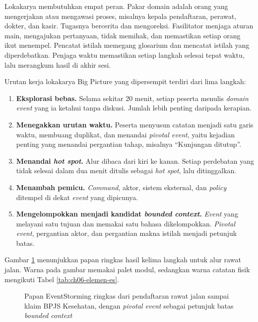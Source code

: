 Lokakarya membutuhkan empat peran. Pakar domain adalah orang yang mengerjakan atau mengawasi proses,
misalnya kepala pendaftaran, perawat, dokter, dan kasir. Tugasnya bercerita dan mengoreksi.
Fasilitator menjaga aturan main, mengajukan pertanyaan, tidak memihak, dan memastikan setiap orang
ikut menempel. Pencatat istilah memegang glosarium dan mencatat istilah yang diperdebatkan.
Penjaga waktu memastikan setiap langkah selesai tepat waktu, lalu merangkum hasil di akhir sesi.

Urutan kerja lokakarya Big Picture yang dipersempit terdiri dari lima langkah:
\begin{enumerate}
  \item \textbf{Eksplorasi bebas.} Selama sekitar 20 menit, setiap peserta menulis \textit{domain
        event} yang ia ketahui tanpa diskusi. Jumlah lebih penting daripada kerapian.
  \item \textbf{Menegakkan urutan waktu.} Peserta menyusun catatan menjadi satu garis waktu,
        membuang duplikat, dan menandai \textit{pivotal event}, yaitu kejadian penting yang
        menandai pergantian tahap, misalnya ``Kunjungan ditutup''.
  \item \textbf{Menandai \textit{hot spot}.} Alur dibaca dari kiri ke kanan. Setiap perdebatan
        yang tidak selesai dalam dua menit ditulis sebagai \textit{hot spot}, lalu ditinggalkan.
  \item \textbf{Menambah pemicu.} \textit{Command}, aktor, sistem eksternal, dan \textit{policy}
        ditempel di dekat \textit{event} yang dipicunya.
  \item \textbf{Mengelompokkan menjadi kandidat \textit{bounded context}.} \textit{Event} yang
        melayani satu tujuan dan memakai satu bahasa dikelompokkan. \textit{Pivotal event},
        pergantian aktor, dan pergantian makna istilah menjadi petunjuk batas.
\end{enumerate}

Gambar \ref{fig:ch06-papan} menunjukkan papan ringkas hasil kelima langkah untuk alur rawat jalan.
Warna pada gambar memakai palet modul, sedangkan warna catatan fisik mengikuti Tabel
\ref{tab:ch06-elemen-es}.

\begin{figure}[!htb]
  \centering
  
  \caption{Papan EventStorming ringkas dari pendaftaran rawat jalan sampai klaim BPJS Kesehatan,
           dengan \textit{pivotal event} sebagai petunjuk batas \textit{bounded context}}
  \label{fig:ch06-papan}
\end{figure}

